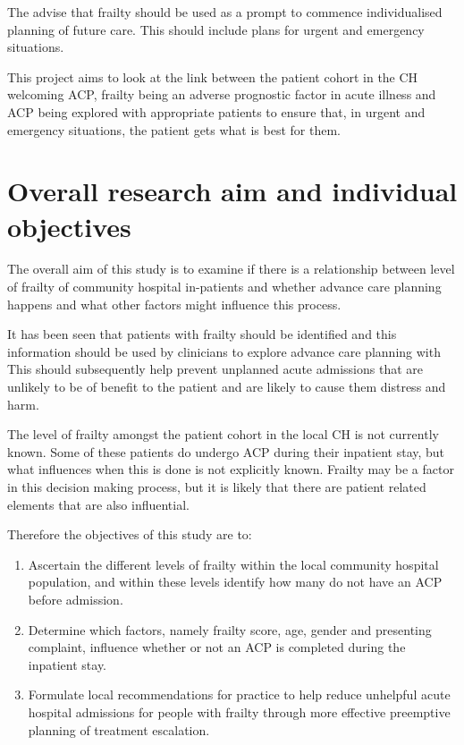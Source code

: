 \documentclass
[
	12pt,
	a4paper,
	oneside,
]{report}
\begin{document}
The \textcite{bgs:14} advise that frailty should be used as a prompt to
commence individualised planning of future care. This should include plans
for urgent and emergency situations.

This project aims to look at the link between the patient cohort in the CH
welcoming ACP, frailty being an adverse prognostic factor in acute illness and
ACP being explored with appropriate patients to ensure that, in urgent and 
emergency situations, the patient gets what is best for them.








\section{Overall research aim and individual objectives}

The overall aim of this study is to examine if there is a relationship 
between
level of frailty of community hospital in-patients and whether advance care planning
happens and what other factors might influence this process.

It has been seen that patients with frailty should be identified and this 
information should be used by clinicians to explore advance care planning with 
This should subsequently help prevent unplanned acute admissions that are 
unlikely to be of benefit to the patient and are likely to cause them distress 
and harm.

The level of frailty amongst the patient cohort in the local CH is not currently
known. Some of these patients do undergo ACP during their inpatient stay, but what 
influences when this is done is not explicitly known. Frailty may be a factor
in this decision making process, but it is likely that there are patient 
related elements that are also influential.

Therefore the objectives of this study are to:
\begin{enumerate}
\item	Ascertain the different levels of frailty within the local 
		community hospital population, and within these levels identify 
		how many do not have an ACP before admission.\label{obj:prevalence}
\item	Determine which factors, namely frailty score, age, gender and
		presenting complaint, influence whether or not an ACP is 
		completed during the inpatient stay.\label{obj:association}
\item	Formulate local recommendations for practice to help reduce unhelpful
		acute hospital admissions for people with frailty through more 
		effective preemptive planning of treatment escalation.
		\label{obj:recommend}
\end{enumerate}
\end{document}
